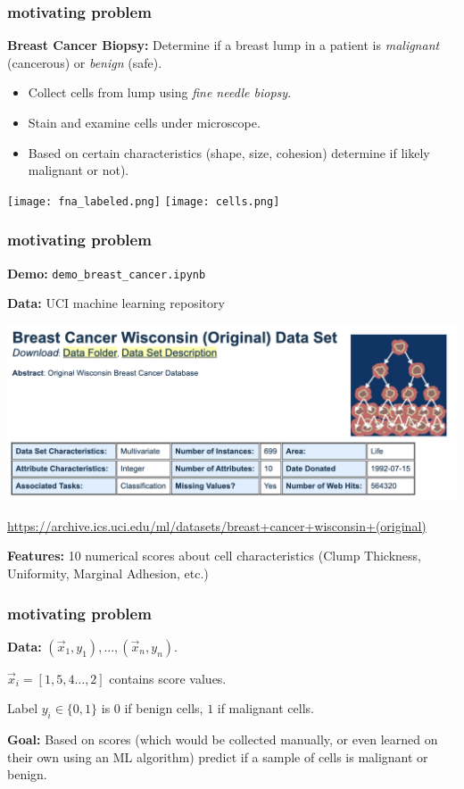 \documentclass[handout,compress]{beamer}
\begin{document}
\begin{frame}
	\frametitle{motivating problem}
	\textbf{Breast Cancer Biopsy:} Determine if a breast lump in a patient is \emph{malignant} (cancerous) or \emph{benign} (safe). 
	\begin{itemize}
		\item Collect cells from lump using \emph{fine needle biopsy}.
		\item Stain and examine cells under microscope.
		\item Based on certain characteristics (shape, size, cohesion) determine if likely malignant or not).
	\end{itemize}
\begin{center}
	\texttt{[image: fna\_labeled.png]} \texttt{[image: cells.png]}
\end{center}
\end{frame}

\begin{frame}
	\frametitle{motivating problem}
	\textbf{Demo:} \texttt{demo\_breast\_cancer.ipynb}
	
	\textbf{Data:} UCI machine learning repository
	\begin{center}
		\includegraphics[width=.9\textwidth]{uci_cancer.png}
		
		\footnotesize{\url{https://archive.ics.uci.edu/ml/datasets/breast+cancer+wisconsin+(original)}}
	\end{center}

	\textbf{Features:} 10 numerical scores about cell characteristics (Clump Thickness, Uniformity, Marginal Adhesion, etc.)
	
\end{frame}

\begin{frame}
	\frametitle{motivating problem}
	\textbf{Data:} $(\vec{x}_1, y_1), \ldots, (\vec{x}_n, y_n)$. 
	
	$\vec{x}_i = [1,5,4\ldots, 2]$ contains score values. 
	
	Label $y_i\in \{0,1\}$ is $0$ if benign cells, $1$ if malignant cells.
	
	\textbf{Goal:} Based on scores (which would be collected manually, or even learned on their own using an ML algorithm) predict if a sample of cells is malignant or benign. 
\end{frame}
\end{document}
